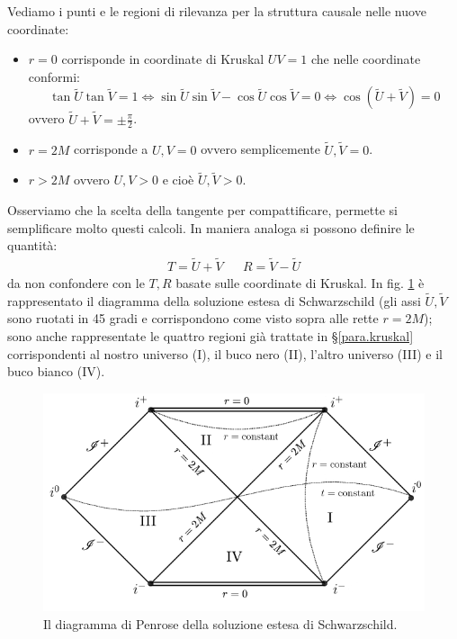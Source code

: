 Vediamo i punti e le regioni di rilevanza per la struttura causale nelle nuove coordinate:
\begin{itemize}
    \item $r = 0$ corrisponde in coordinate di Kruskal $UV=1$ che nelle coordinate conformi:
    \begin{equation*}
        \tan\tilde{U}\tan\tilde{V} = 1 \iff \sin\tilde{U}\sin\tilde{V}-\cos\tilde{U}\cos\tilde{V}=0 \iff \cos(\tilde{U}+\tilde{V})=0
    \end{equation*}
    ovvero $\tilde{U}+\tilde{V}= \pm \frac{\pi}{2}$.
    \item $r=2M$ corrisponde a $U , V = 0$ ovvero semplicemente $\tilde{U}, \tilde{V}=0$.
    \item $r>2M$ ovvero $U, V > 0$ e cioè $\tilde{U}, \tilde{V}>0$.
\end{itemize}
Osserviamo che la scelta della tangente per compattificare, permette si semplificare molto questi calcoli. In maniera analoga si possono definire le quantità:
\begin{align*}
    T = \tilde{U}+ \tilde{V} && R = \tilde{V}- \tilde{U}
\end{align*}
da non confondere con le $T, R$ basate sulle coordinate di Kruskal. In fig. \ref{fig.penrose_schwarz} è rappresentato il diagramma della soluzione estesa di Schwarzschild (gli assi $\tilde{U},\tilde{V}$ sono ruotati in 45 gradi e corrispondono come visto sopra alle rette $r=2M$); sono anche rappresentate le quattro regioni già trattate in \S\ref{para.kruskal} corrispondenti al nostro universo (I), il buco nero (II), l'altro universo (III) e il buco bianco (IV).
\begin{figure}
    \centering
    \includegraphics[scale=0.65]{immagini/penrose_schwarz.png}
    \caption{Il diagramma di Penrose della soluzione estesa di Schwarzschild.}
    \label{fig.penrose_schwarz}
\end{figure}

